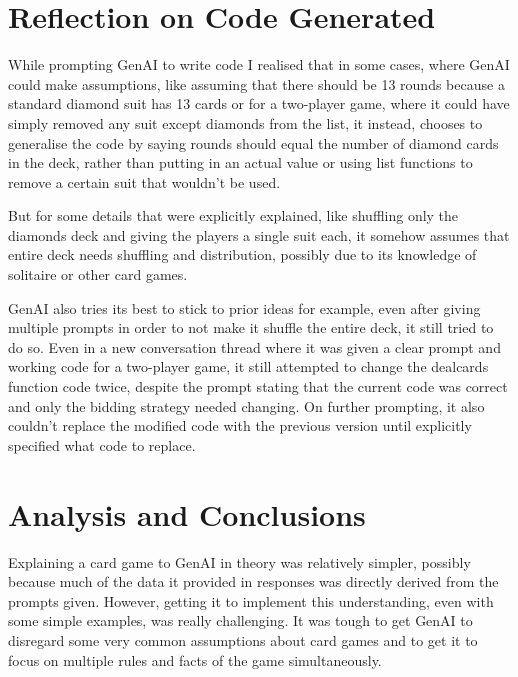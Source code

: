 \documentclass[10pt,onecolumn,letterpaper]{article}
\begin{document}
\section{Reflection on Code Generated}
While prompting GenAI to write code I realised that in some cases, where GenAI could make assumptions, like assuming that there should be 13 rounds because a standard diamond suit has 13 cards or  for a two-player game, where it could have simply removed any suit except diamonds from the list, it instead, chooses to generalise the code by saying rounds should equal the number of diamond cards in the deck, rather than putting in an actual value or using list functions to remove a certain suit that wouldn’t be used.

But for some details that were explicitly explained, like shuffling only the diamonds deck and giving the players a single suit each, it somehow assumes that entire deck needs shuffling and distribution, possibly due to its knowledge of solitaire or other card games.

GenAI also tries its best to stick to prior ideas for example, even after giving multiple prompts in order to not make it shuffle the entire deck, it still tried to do so. Even in a new conversation thread where it was given a clear prompt and working code for a two-player game, it still attempted to change the deal\textunderscore cards function code twice, despite the prompt stating that the current code was correct and only the bidding strategy needed changing. On further prompting, it also couldn't replace the modified code with the previous version until explicitly specified what code to replace.

\section*{Analysis and Conclusions}
Explaining a card game to GenAI in theory was relatively simpler, possibly because much of the data it provided in responses was directly derived from the prompts given. However, getting it to implement this understanding, even with some simple examples, was really challenging. It was tough to get GenAI to disregard some very common assumptions about card games and to get it to focus on multiple rules and facts of the game simultaneously.
\end{document}
